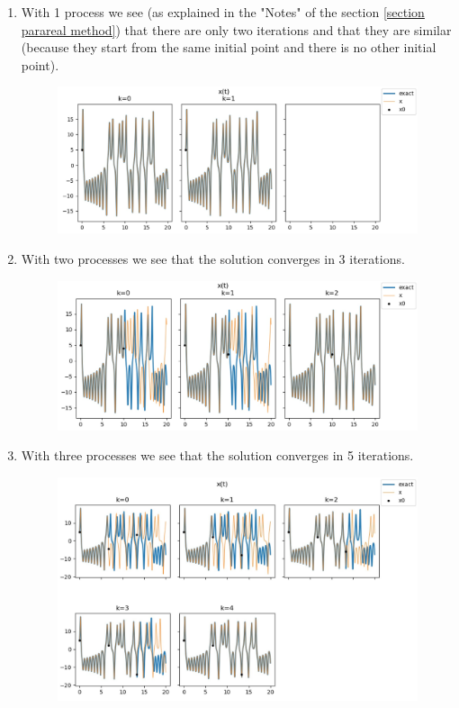 \begin{enumerate}[label=\textbullet]

	\item With 1 process we see (as explained in the "Notes" of the section \ref{section parareal method}) that there are only two iterations and that they are similar (because they start from the same initial point and there is no other initial point).
	\begin{figure}[H]
		\centering       
		\includegraphics[width=0.9\linewidth]{"images/parareal/lorenz_1p.jpg"}
		\label{lorenz:1}
	\end{figure}
\newpage
	\item With two processes we see that the solution converges in 3 iterations.
	\begin{figure}[H]       
		\centering
		\includegraphics[width=0.9\linewidth]{"images/parareal/lorenz_2p.jpg"}
		\label{lorenz:2}
	\end{figure}
	\item With three processes we see that the solution converges in 5 iterations.
	\begin{figure}[H]       
		\centering
		\includegraphics[width=0.9\linewidth]{"images/parareal/lorenz_3p.jpg"}

\end{figure}
\end{enumerate}
